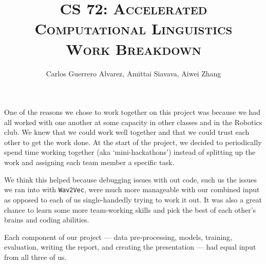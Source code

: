 \title{
  \Huge{\textsc{CS 72: Accelerated Computational Linguistics}}\\
  \small{\textsc{Work Breakdown}}
}

\date{\Large{}}

\begin{titlingpage}

  \author{
    \Large{Carlos Guerrero Alvarez},
    \Large{Amittai Siavava},
    \Large{Aiwei Zhang}
  }

  \maketitle

  One of the reasons we chose to work together on this project was because
  we had all worked with one another at some capacity in other classes
  and in the Robotics club. We knew that we could work well together and
  that we could trust each other to get the work done.
  At the start of the project, we decided to periodically
  spend time working together (aka `mini-hackathons')
  instead of splitting up the work and assigning each team member
  a specific task.

  We think this helped because debugging issues with out code,
  such us the issues we ran into with \verb|Wav2Vec|, were much
  more manageable with our combined input as opposed to each
  of us single-handedly trying to work it out.
  It was also a great chance to learn some more team-working skills
  and pick the best of each other's brains and coding abilities.

  Each component of our project --- data pre-processing, models, training,
  evaluation, writing the report, and creating the presentation ---
  had equal input from all three of us.
\end{titlingpage}

